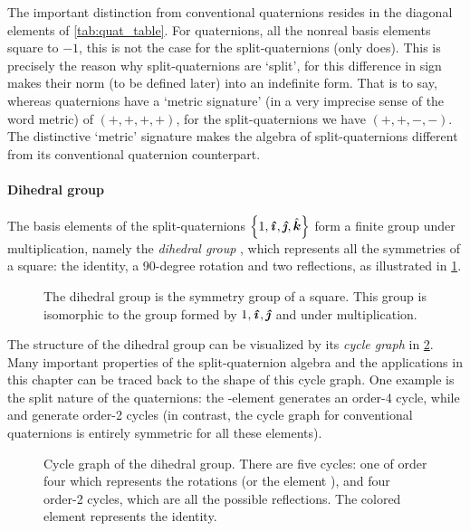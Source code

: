 The important distinction from conventional quaternions resides in the diagonal elements of \cref{tab:quat_table}. For quaternions, all the nonreal basis elements square to $-1$, this is not the case for the split-quaternions (only \quati does). This is precisely the reason why split-quaternions are `split', for this difference in sign makes their norm (to be defined later) into an indefinite form. That is to say, whereas quaternions have a `metric signature' (in a very imprecise sense of the word metric) of $(+, +, +, +)$, for the split-quaternions we have $(+, +, -, -)$. The distinctive `metric' signature makes the algebra of split-quaternions  different from its conventional quaternion counterpart.

\paragraph{Dihedral group} The basis elements of the split-quaternions $\qty{1, \quati, \quatj, \quatk}$ form a finite group under multiplication, namely the \emph{dihedral group} , which represents all the symmetries of a square: the identity, a 90-degree rotation and two reflections, as illustrated in \cref{fig:square_symmetry}. \cite{Dummit2004}
\begin{figure}[h!]
    \centering
    
    \caption{The dihedral group  is the symmetry group of a square. This group is isomorphic to the group formed by $1, \quati, \quatj$ and \quatk under multiplication.}
    \label{fig:square_symmetry}
\end{figure}

The structure of the dihedral group can be visualized by its \emph{cycle graph} in \cref{fig:cycle_graph}. Many important properties of the split-quaternion algebra and the applications in this chapter can be traced back to the shape of this cycle graph. One example is the split nature of the quaternions: the \quati-element generates an order-4 cycle, while \quatj and \quatk generate order-2 cycles (in contrast, the cycle graph for conventional quaternions is entirely symmetric for all these elements). \cite{Dummit2004}
\begin{figure}[h!]
    \centering
    
    \caption{Cycle graph of the dihedral group. There are five cycles: one of order four which represents the rotations (or the element \quati), and four order-2 cycles, which are all the possible reflections. The colored element represents the identity.}
    \label{fig:cycle_graph}
\end{figure}

